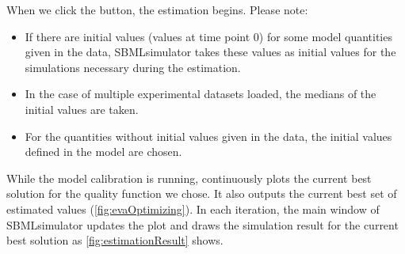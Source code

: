 When we click the  button, the estimation begins.
Please note:
\begin{itemize}
  \item If there are initial values (\ie values at time point 0) for some model quantities given in the data, SBMLsimulator takes these values as initial values for the simulations necessary during the estimation.
  \item In the case of multiple experimental datasets loaded, the medians of the initial values are taken.
  \item For the quantities without initial values given in the data, the initial values defined in the model are chosen.
\end{itemize}

While the model calibration is running, \EvA continuously plots the current best solution for the quality function we chose.
It also outputs the current best set of estimated values (\cref{fig:evaOptimizing}).
In each iteration, the main window of SBMLsimulator updates the plot and draws the simulation result for the current best solution as \cref{fig:estimationResult} shows.

